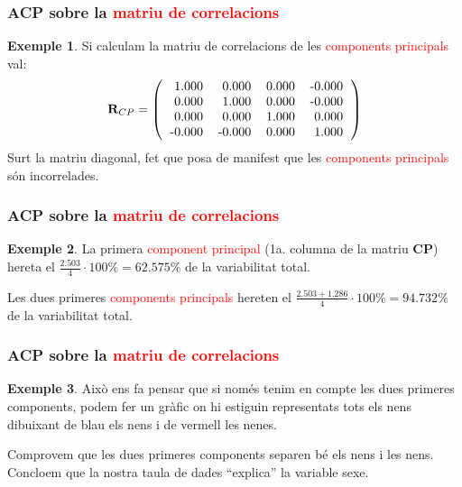 \documentclass[12pt,t]{beamer}
\newcommand{\red}[1]{\textcolor{red}{#1}}
\theoremstyle{plain}
\theoremstyle{definition}
\newtheorem{exemple}{Exemple}
\begin{document}
\begin{frame}
\frametitle{ACP sobre la \red{matriu de correlacions}}
\begin{exemple}
Si calculam la matriu de correlacions de les \red{components principals} val:
\[
\mathbf{R}_{CP}=\left(
\begin{tabular}{rrrr}
  1.000 & 0.000 & 0.000 & -0.000 \\ 
  0.000 & 1.000 & 0.000 & -0.000 \\ 
  0.000 & 0.000 & 1.000 & 0.000 \\ 
  -0.000 & -0.000 & 0.000 & 1.000 \\ 
  \end{tabular}\right)
\]
Surt la matriu diagonal, fet que posa de manifest que les \red{components principals} són incorrelades.
\end{exemple}
\end{frame}



\begin{frame}
\frametitle{ACP sobre la \red{matriu de correlacions}}
\begin{exemple}

La primera \red{component principal} (1a. columna de la matriu $\mathbf{CP}$) hereta el $\frac{2.503}{4}\cdot 100\% = 
62.575\%$ de la variabilitat total.

Les dues primeres \red{components principals} hereten el 
$\frac{2.503 + 1.286}{4}\cdot 100\% = 
94.732\%$ de la variabilitat total.
\end{exemple}
\end{frame}

\begin{frame}
\frametitle{ACP sobre la \red{matriu de correlacions}}
\begin{exemple}
Això ens fa pensar que si només tenim en compte les dues primeres components, podem fer un gràfic on hi estiguin representats tots els nens dibuixant de blau els nens i de vermell les nenes.
\medskip

Comprovem que les dues primeres components separen bé els nens i les nens. Concloem que la nostra taula de dades ``explica'' la variable sexe.
\end{exemple}
\end{frame}
\end{document}
